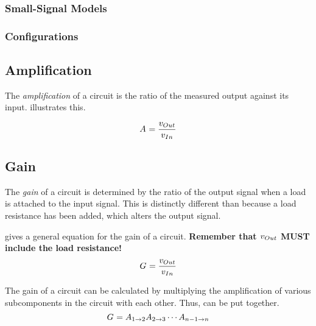 \subsubsection{Small-Signal Models}\label{subsubsec:BJT-Small_Signal_Models}

\subsubsection{Configurations}\label{subsubsec:BJT_Configurations}

\subsection{Amplification}\label{subsec:Amplification}
The \emph{amplification} of a circuit is the ratio of the measured output against its input.
 illustrates this.

\begin{equation}\label{eq:Amplification}
  \Amp{} = \frac{\ACVoltage{\Out}}{\ACVoltage{\In}}
\end{equation}

\subsection{Gain}\label{subsec:Gain}
The \emph{gain} of a circuit is determined by the ratio of the output signal when a load is attached to the input signal.
This is distinctly different than  because a load resistance has been added, which alters the output signal.

 gives a general equation for the gain of a circuit.
\textbf{Remember that $\ACVoltage{\Out}$ MUST include the load resistance!}
\begin{equation}\label{eq:Gain}
  \Gain{} = \frac{\ACVoltage{\Out}}{\ACVoltage{\In}}
\end{equation}

The gain of a circuit can be calculated by multiplying the amplification of various subcomponents in the circuit with each other.
Thus,  can be put together.
\begin{equation}\label{eq:Gain-Broken}
  G_{} = A_{1 \to 2} A_{2 \to 3} \cdots A_{n-1 \to n}
\end{equation}

